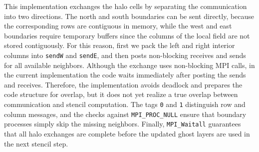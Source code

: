 \documentclass[unicode,10pt,a4paper,oneside,numbers=endperiod,openany]{scrartcl}
\begin{document}
This implementation exchanges the halo cells by separating the communication
into two directions. The north and south boundaries can be sent directly,
because the corresponding rows are contiguous in memory, while the west and
east boundaries require temporary buffers since the columns of the local field
are not stored contiguously. For this reason, first we pack the left and
right interior columns into \texttt{sendW} and \texttt{sendE}, and then posts
non-blocking receives and sends for all available neighbors. Although the exchange uses non-blocking MPI calls, in the current implementation the code waits immediately after posting the sends and receives. Therefore, the implementation avoids deadlock and prepares the code structure for overlap, but it does not yet realize a true overlap between communication and stencil computation. The tags \texttt{0} and \texttt{1} distinguish row and column messages, and the checks
against \texttt{MPI\_PROC\_NULL} ensure that boundary processes simply skip
the missing neighbors. Finally, \texttt{MPI\_Waitall} guarantees that all
halo exchanges are complete before the updated ghost layers are used in the
next stencil step.
\end{document}
